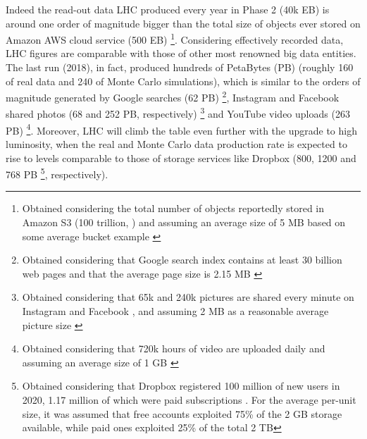 Indeed the read-out data LHC produced every year in Phase 2 (40k EB) is around one order of magnitude bigger than the total size of objects ever stored on Amazon AWS cloud service (500 EB)%
\footnote{Obtained considering the total number of objects reportedly stored in Amazon S3 (100 trillion, ) and assuming an average size of 5 MB based on some average bucket example \cite{amazon2021objectssize}}.
Considering effectively recorded data, LHC figures are comparable with those of other most renowned big data entities. The last run (2018), in fact, produced hundreds of PetaBytes (PB) (roughly 160 of real data and 240 of Monte Carlo simulations),
 which is similar to the orders of magnitude generated by Google searches (62 PB)%
\footnote{Obtained considering that Google search index contains at least 30 billion web pages \cite{van2016estimating, google2021index_size, djuraskovic2020googl_stats, indig2020index_size} and that the average page size is 2.15 MB \cite{http2021webpage_size}
},
Instagram and Facebook shared photos (68 and 252 PB, respectively)%
\footnote{Obtained considering that 65k and 240k pictures are shared every minute on Instagram and Facebook \cite{domo2021infographic}, and assuming 2 MB as a reasonable average picture size \cite{adobe2021fb_img_size}
}
and YouTube video uploads (263 PB)%
\footnote{Obtained considering that 720k hours of video are uploaded daily \cite{dean2021youtube} and assuming an average size of 1 GB \cite{quora2021youtube}
}.
Moreover, LHC will climb the table even further with the upgrade to high luminosity, when the real and Monte Carlo data production rate is expected to rise to levels comparable to those of storage services like Dropbox (800, 1200 and 768 PB%
\footnote{Obtained considering that Dropbox registered 100 million of new users in 2020, 1.17 million of which were paid subscriptions \cite{dean2021dropbox}. For the average per-unit size, it was assumed that free accounts exploited 75\% of the 2 GB storage available, while paid ones exploited 25\% of the total 2 TB
}, respectively). 

